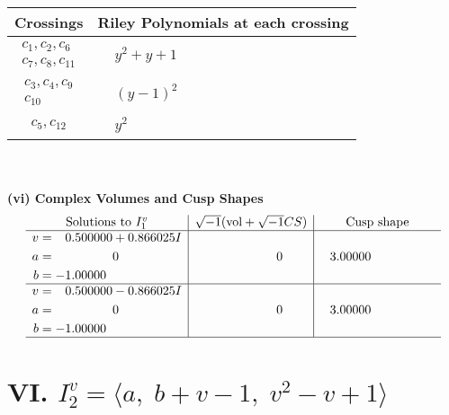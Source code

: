 \documentclass[1p]{elsarticle_modified}
\theoremstyle{definition}
\newcommand{\I}{\sqrt{-1}}
\begin{document}
\begin{tabular}{m{50pt}|m{274pt}}
Crossings & \hspace{64pt}Riley Polynomials at each crossing \\
\hline $$\begin{aligned}c_{1},c_{2},c_{6}\\c_{7},c_{8},c_{11}\end{aligned}$$&$\begin{aligned}
&y^2+y+1
\end{aligned}$\\
\hline $$\begin{aligned}c_{3},c_{4},c_{9}\\c_{10}\end{aligned}$$&$\begin{aligned}
&(y-1)^2
\end{aligned}$\\
\hline $$\begin{aligned}c_{5},c_{12}\end{aligned}$$&$\begin{aligned}
&y^2
\end{aligned}$\\
\hline
\end{tabular}\\~\\
\newpage\flushleft \textbf{(vi) Complex Volumes and Cusp Shapes}
$$\begin{array}{c|c|c}  
\text{Solutions to }I^v_{1}& \I (\text{vol} + \sqrt{-1}CS) & \text{Cusp shape}\\
 \hline 
\begin{aligned}
v &= \phantom{-}0.500000 + 0.866025 I \\
a &= \phantom{-0.000000 } 0 \\
b &= -1.00000\phantom{ +0.000000I}\end{aligned}
 & \phantom{-0.000000 } 0 & \phantom{-}3.00000\phantom{ +0.000000I} \\ \hline\begin{aligned}
v &= \phantom{-}0.500000 - 0.866025 I \\
a &= \phantom{-0.000000 } 0 \\
b &= -1.00000\phantom{ +0.000000I}\end{aligned}
 & \phantom{-0.000000 } 0 & \phantom{-}3.00000\phantom{ +0.000000I}\\
 \hline 
 \end{array}$$\newpage\newpage\renewcommand{\arraystretch}{1}
\centering \section*{VI. $I^v_{2}= \langle a,\;b+v-1,\;v^2- v+1 \rangle$}
\end{document}
